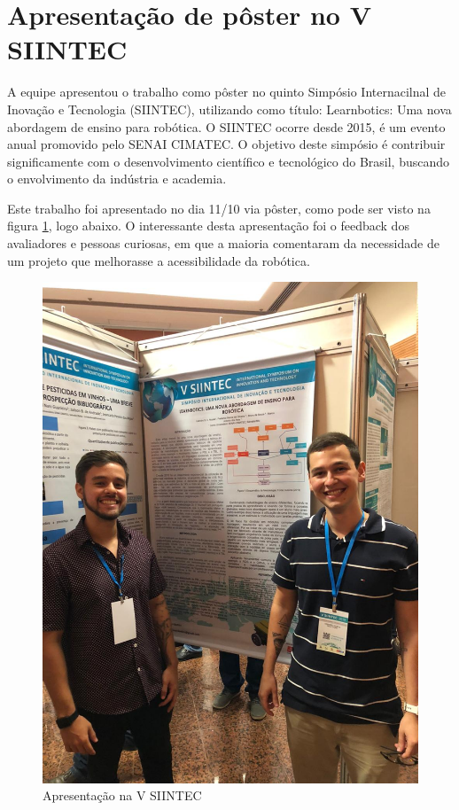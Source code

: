 \section{Apresentação de pôster no V SIINTEC}
A equipe apresentou o trabalho como pôster no quinto Simpósio Internacilnal de Inovação e Tecnologia (SIINTEC), utilizando como título: Learnbotics: Uma nova abordagem de ensino para robótica. O SIINTEC ocorre desde 2015, é um evento anual promovido pelo SENAI CIMATEC. O objetivo deste simpósio é contribuir significamente com o desenvolvimento científico e tecnológico do Brasil, buscando o envolvimento da indústria e academia. 

Este trabalho foi apresentado no dia 11/10 via pôster, como pode ser visto na figura \ref{fig:siintec}, logo abaixo. O interessante desta apresentação foi o feedback dos avaliadores e pessoas curiosas, em que a maioria comentaram da necessidade de um projeto que melhorasse a acessibilidade da robótica. 
\begin{figure}[H]
	\centering
	\includegraphics[scale=0.4, angle=0]{Figures/SIINTEC.jpeg}
	\caption{Apresentação na V SIINTEC}
	\label{fig:siintec}
\end{figure}

